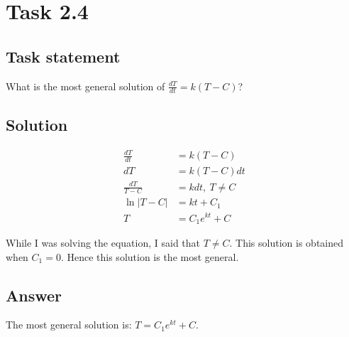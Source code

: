 \section*{Task 2.4}

\subsection*{Task statement}
What is the most general solution of $\frac{dT}{dt} = k(T - C)$?

\subsection*{Solution}

\begin{displaymath}
    \begin{aligned}
        \frac{dT}{dt} & = k(T - C) \\
        dT & = k(T - C)dt \\
        \frac{dT}{T - C} & = kdt,\ T \neq C \\
        \ln{|T - C|} & = kt + C_1 \\
        T & = C_1 e^{kt} + C
    \end{aligned}
\end{displaymath}

While I was solving the equation, I said that $T \neq C$. This solution is obtained when $C_1 = 0$. Hence this solution is the most general.

\subsection*{Answer}

The most general solution is: $T = C_1 e^{kt} + C$.